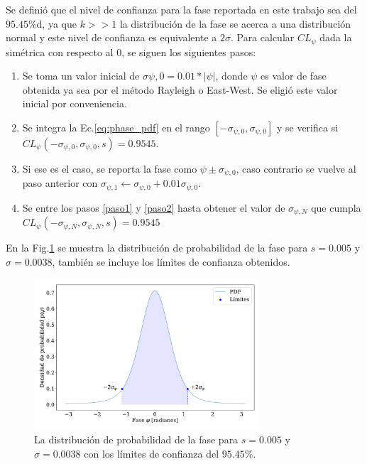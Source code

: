 Se definió que el nivel de confianza para la fase reportada en este trabajo sea del $95.45\%$d, ya que $k>>1$ la distribución de la fase se acerca a una distribución normal y este nivel de confianza es equivalente a $2\sigma$. Para calcular  $CL_\psi$ dada la simétrica  con respecto al 0, se siguen los siguientes  pasos:

\begin{enumerate}
    \item Se toma un valor inicial de $\sigma{\psi,0}=0.01*|\psi|$, donde  $\psi$ es valor de fase obtenida ya sea por el método Rayleigh o East-West. Se eligió este valor inicial por conveniencia.
    \item Se integra la Ec.\ref{eq:phase_pdf} en el rango $[-\sigma_{\psi,0}, \sigma_{\psi,0}]$ y se verifica si $CL_{\psi}(-\sigma_{\psi,0}, \sigma_{\psi,0},s) = 0.9545$. \label{paso1}
    \item Si ese es el caso, se reporta la fase como $\psi \pm \sigma_{\psi,0}$, caso contrario se vuelve al paso anterior con $\sigma_{\psi,1} \leftarrow \sigma_{\psi,0} + 0.01\sigma_{\psi,0}$. \label{paso2}
    \item Se entre los pasos \ref{paso1} y \ref{paso2}  hasta obtener el valor de $\sigma_{\psi,N}$ que cumpla $CL_{\psi}(-\sigma_{\psi,N}, \sigma_{\psi,N},s) = 0.9545$
\end{enumerate}

En la Fig.\ref{fig:phase_prob_ej} se muestra la distribución de probabilidad de la fase para $s=0.005$ y $\sigma = 0.0038$, también se incluye los límites de confianza obtenidos.

\begin{figure}[H]
    \begin{small}
        \begin{center}
            \includegraphics[width=0.75\textwidth]{phase_prob_ej.pdf}
        \end{center}
        \caption{La distribución de probabilidad de la fase para $s=0.005$ y $\sigma = 0.0038$ con los límites de confianza del $95.45\%$.}
        \label{fig:phase_prob_ej}
    \end{small}
\end{figure}
